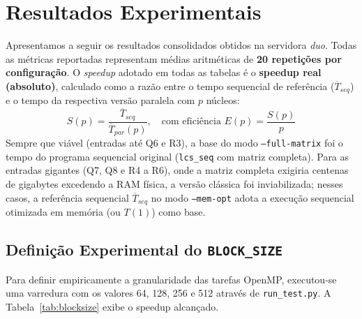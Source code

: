\section{Resultados Experimentais}
\label{sec:resultados}

Apresentamos a seguir os resultados consolidados obtidos na servidora \textit{duo}. Todas as métricas reportadas representam médias aritméticas de \textbf{20 repetições por configuração}. O \textit{speedup} adotado em todas as tabelas é o \textbf{speedup real (absoluto)}, calculado como a razão entre o tempo sequencial de referência ($\overline{T}_{seq}$) e o tempo da respectiva versão paralela com $p$ núcleos:
\begin{equation}
S(p) = \frac{\overline{T}_{seq}}{\overline{T}_{par}(p)}, \quad \text{com eficiência } E(p) = \frac{S(p)}{p}
\label{eq:speedup_real}
\end{equation}
Sempre que viável (entradas até Q6 e R3), a base do modo \texttt{--full-matrix} foi o tempo do programa sequencial original (\texttt{lcs\_seq} com matriz completa). Para as entradas gigantes (Q7, Q8 e R4 a R6), onde a matriz completa exigiria centenas de gigabytes excedendo a RAM física, a versão clássica foi inviabilizada; nesses casos, a referência sequencial $\overline{T}_{seq}$ no modo \texttt{--mem-opt} adota a execução sequencial otimizada em memória (ou $T(1)$) como base.

\subsection{Definição Experimental do \texttt{BLOCK\_SIZE}}
\label{sec:blocksize}

Para definir empiricamente a granularidade das tarefas OpenMP, executou-se uma varredura com os valores 64, 128, 256 e 512 através de \texttt{run\_test.py}. A Tabela~\ref{tab:blocksize} exibe o speedup alcançado.

